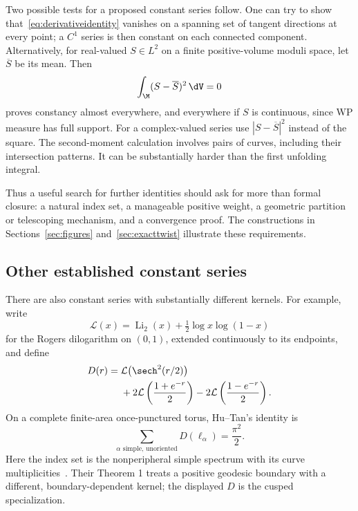 Two possible tests for a proposed constant series follow. One can try to
show that~\eqref{eq:derivativeidentity} vanishes on a spanning set of tangent
directions at every point; a $C^1$ series is then constant on each
connected component. Alternatively, for real-valued $S\in L^2$ on a
finite positive-volume moduli space, let $\overline S$ be its mean. Then
\begin{equation}
 \int_{\M}(S-\overline S)^2\,\dV=0
 \label{eq:variance}
\end{equation}
proves constancy almost everywhere, and everywhere if $S$ is continuous,
since WP measure has full support. For a complex-valued series use
$|S-\overline S|^2$ instead of the square.
The second-moment calculation involves pairs of curves, including their
intersection patterns. It can be substantially harder than the first
unfolding integral.

Thus a useful search for further identities should ask for more than
formal closure: a natural index set, a manageable positive weight, a
geometric partition or telescoping mechanism, and a convergence proof.
The constructions in Sections~\ref{sec:figures} and~\ref{sec:exacttwist}
illustrate these requirements.

\subsection{Other established constant series}

There are also constant series with substantially different kernels.
For example, write
\[
 \mathcal L(x)=\operatorname{Li}_2(x)+\tfrac12\log x\log(1-x)
\]
for the Rogers dilogarithm on $(0,1)$, extended continuously to its
endpoints, and define
\begin{align*}
 D(r)={}&\mathcal L\bigl(\sech^2(r/2)\bigr)\\
 &+2\mathcal L\left(\frac{1+e^{-r}}2\right)
  -2\mathcal L\left(\frac{1-e^{-r}}2\right).
\end{align*}
On a complete finite-area once-punctured torus, Hu--Tan's identity is
\begin{equation}
 \sum_{\alpha\text{ simple, unoriented}}D(\ell_\alpha)=\frac{\pi^2}{2}.
 \label{eq:dilogtorus}
\end{equation}
Here the index set is the nonperipheral simple spectrum with its curve
multiplicities~\cite[Theorem 2, equation (2)]{HuTan}. Their Theorem 1
treats a positive geodesic boundary with a different, boundary-dependent
kernel; the displayed $D$ is the cusped specialization.

